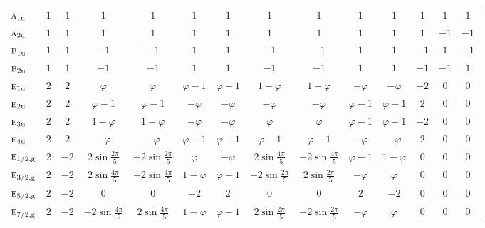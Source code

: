 \documentclass[10pt,a4paper]{article}
\makeatletter
\def\grouprule#1#2{\noalign{\marks\LTgroupmarks{\the\belowrulesep}\nobreak\vskip#1%
  \vskip\aboverulesep}\multispan\LT@cols\unskip{\leaders\hrule\@height#2\hfill\kern\z@}\cr
  \noalign{\penalty\LTrulebreak\vskip\belowrulesep\global\@lastruleclass\z@}}
\numberwithin{equation}{section}
\newcommand{\irr}[1]{\text{\normalfont\scshape #1}}
\newcommand{\ptag}[1]{\mathrm{#1}}
\newcommand{\goldenratio}{\varphi}
\makeatother
\begin{document}
{{\begin{longtable}{@{}lccccccccccccc@{}}
$\irr{a}_{1\ptag{u}}$ & $1$ & $1$ & $1$ & $1$ & $1$ & $1$ & $1$ & $1$ & $1$ & $1$ & $1$ & $1$ & $1$\\
$\irr{a}_{2\ptag{u}}$ & $1$ & $1$ & $1$ & $1$ & $1$ & $1$ & $1$ & $1$ & $1$ & $1$ & $1$ & $-1$ & $-1$\\
$\irr{b}_{1\ptag{u}}$ & $1$ & $1$ & $-1$ & $-1$ & $1$ & $1$ & $-1$ & $-1$ & $1$ & $1$ & $-1$ & $1$ & $-1$\\
$\irr{b}_{2\ptag{u}}$ & $1$ & $1$ & $-1$ & $-1$ & $1$ & $1$ & $-1$ & $-1$ & $1$ & $1$ & $-1$ & $-1$ & $1$\\
$\irr{e}_{1\ptag{u}}$ & $2$ & $2$ & $\goldenratio{}$ & $\goldenratio{}$ & $\goldenratio - 1$ & $\goldenratio - 1$ & $1 - \goldenratio{}$ & $1 - \goldenratio{}$ & $-\goldenratio{}$ & $-\goldenratio{}$ & $-2$ & $0$ & $0$\\
$\irr{e}_{2\ptag{u}}$ & $2$ & $2$ & $\goldenratio - 1$ & $\goldenratio - 1$ & $-\goldenratio{}$ & $-\goldenratio{}$ & $-\goldenratio{}$ & $-\goldenratio{}$ & $\goldenratio - 1$ & $\goldenratio - 1$ & $2$ & $0$ & $0$\\
$\irr{e}_{3\ptag{u}}$ & $2$ & $2$ & $1 - \goldenratio{}$ & $1 - \goldenratio{}$ & $-\goldenratio{}$ & $-\goldenratio{}$ & $\goldenratio{}$ & $\goldenratio{}$ & $\goldenratio - 1$ & $\goldenratio - 1$ & $-2$ & $0$ & $0$\\
$\irr{e}_{4\ptag{u}}$ & $2$ & $2$ & $-\goldenratio{}$ & $-\goldenratio{}$ & $\goldenratio - 1$ & $\goldenratio - 1$ & $\goldenratio - 1$ & $\goldenratio - 1$ & $-\goldenratio{}$ & $-\goldenratio{}$ & $2$ & $0$ & $0$\\
\grouprule{0pt}{\lightrulewidth}
$\irr{e}_{1/2,\ptag{g}}$ & $2$ & $-2$ & $2\sin\tfrac{2\pi}{5}$ & $-2\sin\tfrac{2\pi}{5}$ & $\goldenratio{}$ & $-\goldenratio{}$ & $2\sin\tfrac{4\pi}{5}$ & $-2\sin\tfrac{4\pi}{5}$ & $\goldenratio - 1$ & $1 - \goldenratio{}$ & $0$ & $0$ & $0$\\
$\irr{e}_{3/2,\ptag{g}}$ & $2$ & $-2$ & $2\sin\tfrac{4\pi}{5}$ & $-2\sin\tfrac{4\pi}{5}$ & $1 - \goldenratio{}$ & $\goldenratio - 1$ & $-2\sin\tfrac{2\pi}{5}$ & $2\sin\tfrac{2\pi}{5}$ & $-\goldenratio{}$ & $\goldenratio{}$ & $0$ & $0$ & $0$\\
$\irr{e}_{5/2,\ptag{g}}$ & $2$ & $-2$ & $0$ & $0$ & $-2$ & $2$ & $0$ & $0$ & $2$ & $-2$ & $0$ & $0$ & $0$\\
$\irr{e}_{7/2,\ptag{g}}$ & $2$ & $-2$ & $-2\sin\tfrac{4\pi}{5}$ & $2\sin\tfrac{4\pi}{5}$ & $1 - \goldenratio{}$ & $\goldenratio - 1$ & $2\sin\tfrac{2\pi}{5}$ & $-2\sin\tfrac{2\pi}{5}$ & $-\goldenratio{}$ & $\goldenratio{}$ & $0$ & $0$ & $0$\\

\end{longtable}}}
\end{document}
